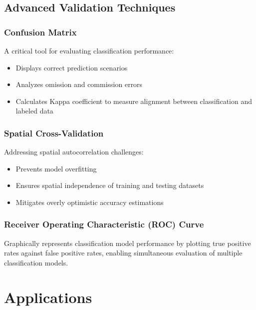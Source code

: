 \documentclass[
  letterpaper,
]{scrbook}
\begin{document}
\subsection{Advanced Validation
Techniques}\label{advanced-validation-techniques}

\subsubsection{Confusion Matrix}\label{confusion-matrix}

A critical tool for evaluating classification performance:

\begin{itemize}
\item
  Displays correct prediction scenarios
\item
  Analyzes omission and commission errors
\item
  Calculates Kappa coefficient to measure alignment between
  classification and labeled data
\end{itemize}

\subsubsection{Spatial Cross-Validation}\label{spatial-cross-validation}

Addressing spatial autocorrelation challenges:

\begin{itemize}
\item
  Prevents model overfitting
\item
  Ensures spatial independence of training and testing datasets
\item
  Mitigates overly optimistic accuracy estimations
\end{itemize}

\subsubsection{Receiver Operating Characteristic (ROC)
Curve}\label{receiver-operating-characteristic-roc-curve}

Graphically represents classification model performance by plotting true
positive rates against false positive rates, enabling simultaneous
evaluation of multiple classification models.

\section{Applications}\label{applications-5}
\end{document}
